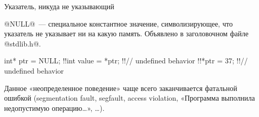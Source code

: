 \newcommand{\memlabel}[3]{
  \path (#1,\memtop) -- (#2,\memtop)
    node [midway,yshift=3mm,text height=1.5ex] {\ttfamily #3};
}

\newcommand{\memblockwithaddr}[5]{
  \memblock{#1}{#2}{#3}
  \memaddr{#1}{#4}
  \memaddr{#2-1}{#5}
}

\newcommand{\memblockwithaddrandlabel}[6]{
  \memblockwithaddr{#1}{#2}{#3}{#4}{#5}
  \memlabel{#1}{#2}{#6}
}

\newcommand{\memblockwithoneaddr}[4]{
  \memblock{#1}{#2}{#3}
  \memaddr{#1}{#4}
}

\newcommand{\memblockwithoneaddrandlabel}[5]{
  \memblockwithoneaddr{#1}{#2}{#3}{#4}
  \memlabel{#1}{#2}{#5}
}


\begin{frame}[fragile]{Указатель, никуда не указывающий}

  @NULL@~--- специальное константное значение, символизирующее, что указатель
  не указывает ни на какую память.
  Объявлено в заголовочном файле @stdlib.h@.

  \begin{clisting}[escapechar=\!]
    int* ptr = NULL;
    !!int value = *ptr; !!// undefined behavior
    !!*ptr = 37; !!// undefined behavior
  \end{clisting}

  Данное «неопределенное поведение» чаще всего заканчивается фатальной ошибкой
  (segmentation fault, segfault, access violation,
  «Программа выполнила недопустимую операцию…», …).

\end{frame}

